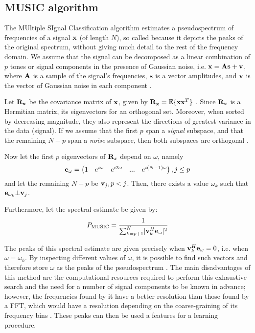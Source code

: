 \documentclass[../main.tex]{subfiles} \label{chapter_soa}
\begin{document}
\subsection{MUSIC algorithm} \label{subsection_music}
The MUltiple SIgnal Classification algorithm estimates a pseudospectrum of frequencies of a signal $\mathbf{x}$ (of length $N$), so called because it depicts the peaks of the original spectrum, without giving much detail to the rest of the frequency domain. We assume that the signal can be decomposed as a linear combination of $p$ tones or signal components in the presence of Gaussian noise, i.e. $\mathbf{x} = \mathbf{As} + \mathbf{v}$, where $\mathbf{A}$ is a sample of the signal's frequencies, $\mathbf{s}$ is a vector amplitudes, and $\mathbf{v}$ is the vector of Gaussian noise in each component \cite{Evans}.
\par Let $\mathbf{R_x}$ be the covariance matrix of $\mathbf{x}$, given by $\mathbf{R_x} = \mathbb{E}\{\mathbf{xx}^T\}$ \cite{Evans}. Since $\mathbf{R_x}$ is a Hermitian matrix, its eigenvectors for an orthogonal set. Moreover, when sorted by decreasing magnitude, they also represent the directions of greatest variance in the data (signal). If we assume that the first $p$ span a \emph{signal} subspace, and that the remaining $N-p$ span a \emph{noise} subspace, then both subspaces are orthogonal \cite{Systems1989}. 
\par Now let the first $p$ eigenvectors of $\mathbf{R}_x$ depend on $\omega$, namely
\begin{align*}
\mathbf{e}_{\omega} = \begin{pmatrix}1&e^{i\omega}&e^{i2\omega}&...&e^{i(N-1)\omega}\end{pmatrix}, j \leq p
\end{align*}
and let the remaining $N-p$ be $\mathbf{v}_j, p < j$. Then, there exists a value $\omega_{k}$ such that $\mathbf{e}_{\omega_k}\bot\mathbf{v}_j$. 
\par Furthermore, let the spectral estimate \cite{Kootsookos1999, Mathworks2015} be given by:
\begin{align*}
P_\text{MUSIC} = \frac{1}{\sum_{k=p+1}^{N}\lvert\mathbf{v}_k^H\mathbf{e}_{\omega}\rvert^2}
\end{align*}
\par The peaks of this spectral estimate are given precisely when $\mathbf{v}_k^H\mathbf{e}_{\omega} = 0$, i.e. when $\omega = \omega_k$. By inspecting different values of $\omega$, it is possible to find such vectors and therefore store $\omega$ as the peaks of the pseudospectrum \cite{Delft2011}. The main disadvantages of this method are the computational resources required to perform this exhaustive search and the need for a number of signal components to be known in advance; however, the frequencies found by it have a better resolution than those found by a FFT, which would have a resolution depending on the coarse-graining of its frequency bins \cite{Kootsookos1999}. These peaks can then be used a features for a learning procedure.
\end{document}
